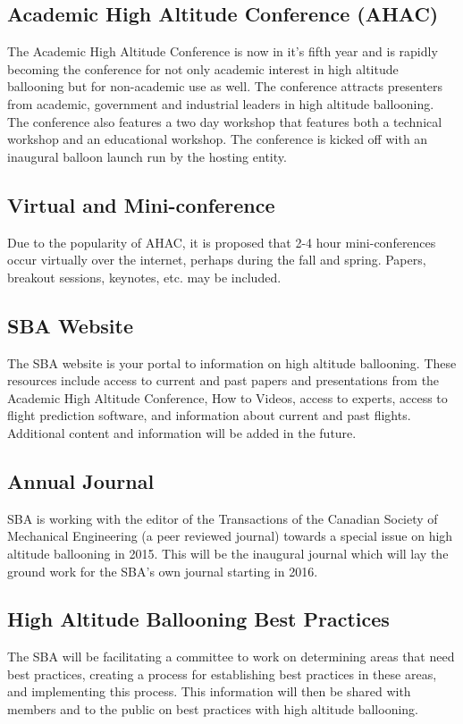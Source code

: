 \documentclass[10pt,foldmark,notumble]{leaflet}
\begin{document}
\subsection{Academic High Altitude Conference (AHAC)}
The Academic High Altitude Conference is now in it's fifth year and is rapidly becoming the conference for not only academic interest in high altitude ballooning but for non-academic use as well.  The conference attracts presenters from academic, government and industrial leaders in high altitude ballooning.  The conference also features a two day workshop that features both a technical workshop and an educational workshop.  The conference is kicked off with an inaugural balloon launch run by the hosting entity.


\subsection{Virtual and Mini-conference}  
Due to the popularity of AHAC, it is proposed that 2-4 hour mini-conferences occur virtually over the internet, perhaps during the fall and spring. Papers, breakout sessions, keynotes, etc. may be included.

\subsection{SBA Website}
The SBA website is your portal to information on high altitude ballooning.  These resources include access to current and past papers and presentations from the Academic High Altitude Conference, How to Videos, access to experts, access to flight prediction software, and information about current and past flights.  Additional content and information will be added in the future.

\subsection{Annual Journal}
SBA is working with the editor of the Transactions of the Canadian Society of Mechanical Engineering (a peer reviewed journal) towards a special issue on high altitude ballooning in 2015.  This will be the inaugural journal which will lay the ground work for the SBA's own journal starting in 2016. 
\ \\
\subsection{High Altitude Ballooning Best Practices}
The SBA will be facilitating a committee to work on determining areas that need best practices, creating a process for establishing best practices in these areas, and implementing this process.  This information will then be shared with members and to the public on best practices with high altitude ballooning.
\ \\
\end{document}
